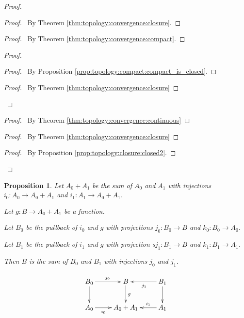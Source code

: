 \documentclass{report}
\newtheorem{prop}[lm]{Proposition}
\theoremstyle{definition}
\begin{document}
  \begin{proof}
   \pf
   \begin{proof}
     \pf\ By Theorem \ref{thm:topology:convergence:closure}.
   \end{proof}
   \begin{proof}
     \pf\ By Theorem \ref{thm:topology:convergence:compact}.
   \end{proof}
   \begin{proof}
     \begin{proof}
       \pf\ By Proposition \ref{prop:topology:compact:compact_is_closed}.
     \end{proof}
     \qedstep
     \begin{proof}
     \pf\ By Theorem \ref{thm:topology:convergence:closure}
   \end{proof}
   \end{proof}
   \begin{proof}
     \pf\ By Theorem \ref{thm:topology:convergence:continuous}
   \end{proof}
   \begin{proof}
     \pf\ By Theorem \ref{thm:topology:convergence:closure}
   \end{proof}
   \qedstep
   \begin{proof}
     \pf\ By Proposition \ref{prop:topology:closure:closed2}.
   \end{proof}
  \end{proof}

  \begin{prop}
    Let $A_0 + A_1$ be the sum of $A_0$ and $A_1$ with injections $i_0 : A_0
\rightarrow A_0 + A_1$ and $i_1 : A_1 \rightarrow A_0 + A_1$.

Let $g : B \rightarrow A_0 + A_1$ be a function.

Let $B_0$ be the pullback of $i_0$ and $g$ with projections $j_0 : B_0
\rightarrow B$ and $k_0 : B_0 \rightarrow A_0$.

Let $B_1$ be the pullback of $i_1$ and $g$ with projection s$j_1 : B_1
\rightarrow B$ and $k_1 : B_1 \rightarrow A_1$.

Then $B$ is the sum of $B_0$ and $B_1$ with injections $j_0$ and $j_1$.

    \[ \xymatrix{
      B_0 \ar[r]^{j_0} \ar[d] & B \ar[d]^g & B_1 \ar[l]^{j_1} \ar[d] \\
      A_0 \ar[r]_-{i_0} & A_0 + A_1 & A_1 \ar[l]_-{i_1}
    } \]
  \end{prop}
\end{document}
